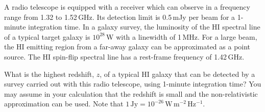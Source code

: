 A radio telescope is equipped with a receiver which can observe in a frequency
range from 1.32 to 1.52\,GHz. Its detection limit is 0.5\,mJy per beam for a
1-minute integration time. In a galaxy survey, the luminosity of the HI
spectral line of a typical target galaxy is $10^{28}$\,W with a linewidth of
1\,MHz. For a large beam, the HI emitting region from a far-away galaxy can be
approximated as a point source. The HI spin-flip spectral line has a
rest-frame frequency of 1.42\,GHz.

What is the highest redshift, $z$, of a typical HI galaxy that can be detected
by a survey carried out with this radio telescope, using 1-minute integration
time? You may assume in your calculation that the redshift is small and the
non-relativistic approximation can be used. Note that
$1\,\mathrm{Jy} = 10^{-26}\,\mathrm{W\,m^{-2}\,Hz^{-1}}$.
